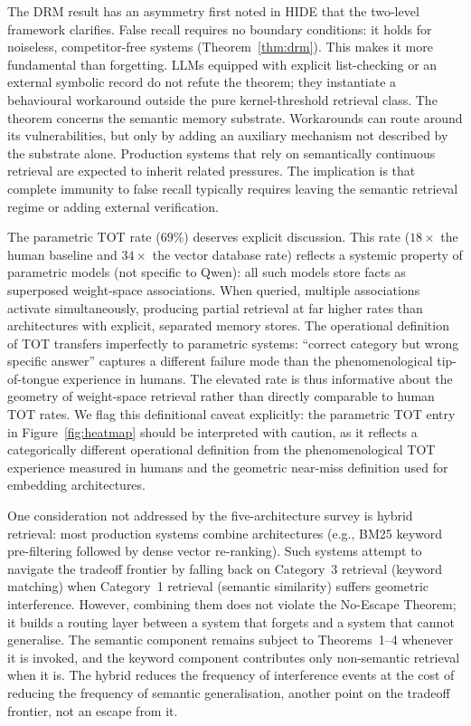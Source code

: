 \documentclass[11pt]{article}
\begin{document}
The DRM result has an asymmetry first noted in HIDE that the two-level framework clarifies. False recall requires no boundary conditions: it holds for noiseless, competitor-free systems (Theorem~\ref{thm:drm}). This makes it more fundamental than forgetting. LLMs equipped with explicit list-checking or an external symbolic record do not refute the theorem; they instantiate a behavioural workaround outside the pure kernel-threshold retrieval class. The theorem concerns the semantic memory substrate. Workarounds can route around its vulnerabilities, but only by adding an auxiliary mechanism not described by the substrate alone. Production systems that rely on semantically continuous retrieval are expected to inherit related pressures. The implication is that complete immunity to false recall typically requires leaving the semantic retrieval regime or adding external verification\cite{roediger1995}.

The parametric TOT rate ($69\%$) deserves explicit discussion. This rate ($18\times$ the human baseline and $34\times$ the vector database rate) reflects a systemic property of parametric models (not specific to Qwen): all such models store facts as superposed weight-space associations. When queried, multiple associations activate simultaneously, producing partial retrieval at far higher rates than architectures with explicit, separated memory stores. The operational definition of TOT transfers imperfectly to parametric systems: ``correct category but wrong specific answer'' captures a different failure mode than the phenomenological tip-of-tongue experience in humans. The elevated rate is thus informative about the geometry of weight-space retrieval rather than directly comparable to human TOT rates. We flag this definitional caveat explicitly: the parametric TOT entry in Figure~\ref{fig:heatmap} should be interpreted with caution, as it reflects a categorically different operational definition from the phenomenological TOT experience measured in humans and the geometric near-miss definition used for embedding architectures.

One consideration not addressed by the five-architecture survey is hybrid retrieval: most production systems combine architectures (e.g., BM25 keyword pre-filtering followed by dense vector re-ranking). Such systems attempt to navigate the tradeoff frontier by falling back on Category~3 retrieval (keyword matching) when Category~1 retrieval (semantic similarity) suffers geometric interference. However, combining them does not violate the No-Escape Theorem; it builds a routing layer between a system that forgets and a system that cannot generalise. The semantic component remains subject to Theorems~1--4 whenever it is invoked, and the keyword component contributes only non-semantic retrieval when it is. The hybrid reduces the frequency of interference events at the cost of reducing the frequency of semantic generalisation, another point on the tradeoff frontier, not an escape from it.
\end{document}
